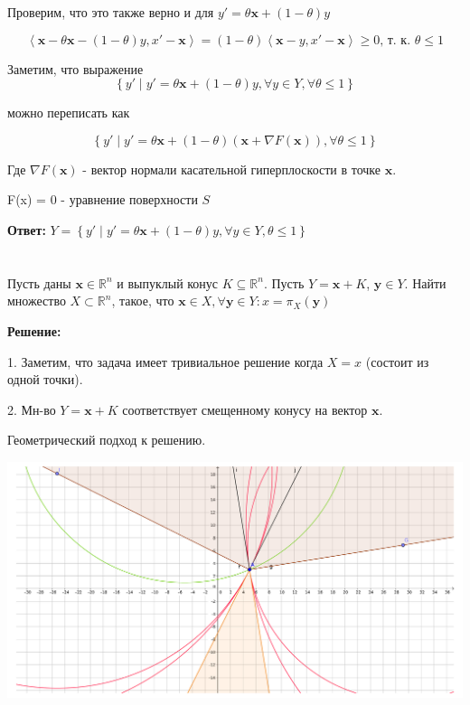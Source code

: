 \documentclass[a4paper,12pt]{article}
\newcommand{\lt}{\left}
\newcommand{\rt}{\right}
\begin{document}
Проверим, что это также верно и для $y' = \theta \mathbf{x} + (1-\theta)y$
 
$$\lt\langle{\mathbf{x} - \theta \mathbf{x} - (1 - \theta)y, x' - \mathbf{x}}\rt\rangle = (1-\theta)\lt\langle{\mathbf{x} - y, x' - \mathbf{x} }\rt\rangle \ge 0 \textbf{, т. к. }\theta \le 1$$
 
\vspace{\baselineskip}

Заметим, что выражение $$\lt\{y' \mid y' = \theta \mathbf{x} + (1-\theta)y, \forall y \in Y, \forall\theta \leq 1  \rt\}$$

 можно переписать как 
 
$$\lt\{y' \mid y' = \theta \mathbf{x} + (1-\theta)(\mathbf{x} + \nabla F(\mathbf{x})), \forall \theta \leq 1  \rt\}$$

Где $\nabla F(\mathbf{x})$ - вектор нормали касательной гиперплоскости в точке $\mathbf{x}$.

F(x) = 0 - уравнение поверхности $S$

\textbf{Ответ:} $Y = \lt\{y' \mid y' = \theta \mathbf{x} + (1-\theta)y, \forall y \in Y, \theta \leq 1  \rt\}$

\section{}

Пусть даны $\mathbf{x} \in \mathbb{R}^n$ и выпуклый конус $K \subseteq \mathbb{R}^n$. Пусть $Y = \mathbf{x} + K$, $\mathbf{y} \in Y$. Найти множество $X \subset \mathbb{R}^n$, такое, что $\mathbf{x} \in X, \forall \mathbf{y} \in Y: x = \pi_X(\mathbf{y})$

\vspace{\baselineskip}

\textbf{Решение:}

\vspace{\baselineskip}

1. Заметим, что задача имеет тривиальное решение когда $X = {x}$ (состоит из одной точки).

\vspace{\baselineskip}

2. Мн-во $Y = \mathbf{x} + K$ соответствует смещенному конусу на вектор $\mathbf{x}$.

Геометрический подход к решению.

\includegraphics[width=\textwidth]{image.pdf}
\end{document}
